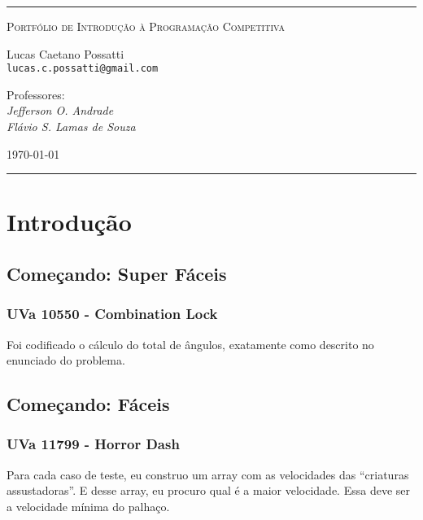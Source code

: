 \documentclass[11pt]{scrartcl}
\begin{document}
\vspace*{\fill}

\hrule
\begin{center}
\Huge
\textsc{Portfólio de Introdução à Programação Competitiva}

\medskip
\Large
Lucas Caetano Possatti\\
\large
\texttt{lucas.c.possatti@gmail.com}

\bigskip

Professores:\\
\emph{Jefferson O. Andrade}\\
\emph{Flávio S. Lamas de Souza}

\bigskip

\today
\end{center}
\hrule

\vspace*{\fill}
\thispagestyle{empty}

\newpage

\setcounter{tocdepth}{2}
\tableofcontents

\newpage


\section{Introdução}

\subsection{Começando: Super Fáceis}

\subsubsection{UVa 10550 - Combination Lock}
Foi codificado o cálculo do total de ângulos, exatamente como descrito
no enunciado do problema.


\subsection{Começando: Fáceis}

\subsubsection{UVa 11799 - Horror Dash}
Para cada caso de teste, eu construo um array com as velocidades das ``criaturas assustadoras''. E desse array, eu procuro qual é a maior velocidade. Essa deve ser a velocidade mínima do palhaço.

\end{document}
